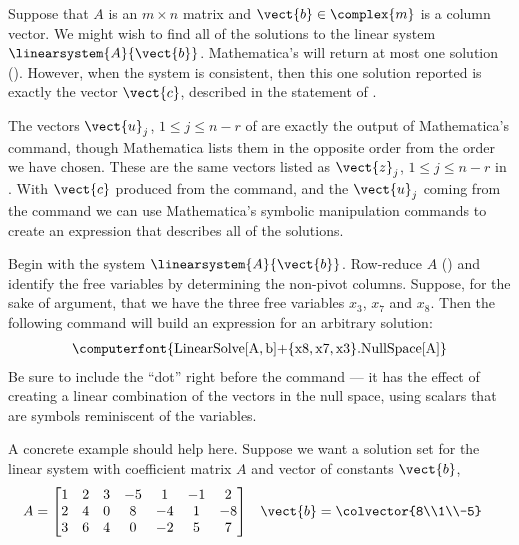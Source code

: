 Suppose that $A$ is an $m\times n$ matrix and $\vect{b}\in\complex{m}$  is a column vector.  We might wish to find all of the solutions to the linear system $\linearsystem{A}{\vect{b}}$.  Mathematica's  will return at most one solution ().  However, when the system is consistent, then this one solution reported is exactly the vector $\vect{c}$, described in the statement of .\par
%
The vectors $\vect{u}_j$, $1\leq j\leq n-r$ of  are exactly the output of Mathematica's  command, though Mathematica lists them in the opposite order from the order we have chosen.  These are the same vectors listed as $\vect{z}_j$, $1\leq j\leq n-r$ in .  With $\vect{c}$ produced from the  command, and the $\vect{u}_j$ coming from the  command we can use Mathematica's symbolic manipulation commands to create an expression that describes all of the solutions.\par
%
Begin with the system $\linearsystem{A}{\vect{b}}$.  Row-reduce $A$ () and identify the free variables by determining the non-pivot columns.  Suppose, for the sake of argument, that we have the three free variables $x_3$, $x_7$ and $x_8$.  Then the following command will build an expression for an arbitrary solution:
%
\begin{align*}
\text{\computerfont{LinearSolve[A,\,b]+\{x8,\,x7,\,x3\}.NullSpace[A]}}
\end{align*}
%
%
Be sure to include the ``dot'' right before the  command --- it has the effect of creating a linear combination of the vectors in the null space, using scalars that are symbols reminiscent of the variables.\par
%
A concrete example should help here.  Suppose we want a solution set for the linear system with coefficient matrix $A$ and vector of constants $\vect{b}$,
%
\begin{align*}
A&=
\begin{bmatrix}
 1 & 2 & 3 & -5 & 1 & -1 & 2\\
 2 & 4 & 0 & 8 & -4 & 1 & -8\\
 3 & 6 & 4 & 0 & -2 & 5 & 7
\end{bmatrix}
&
\vect{b}&=
\colvector{8\\1\\-5}
\end{align*}
